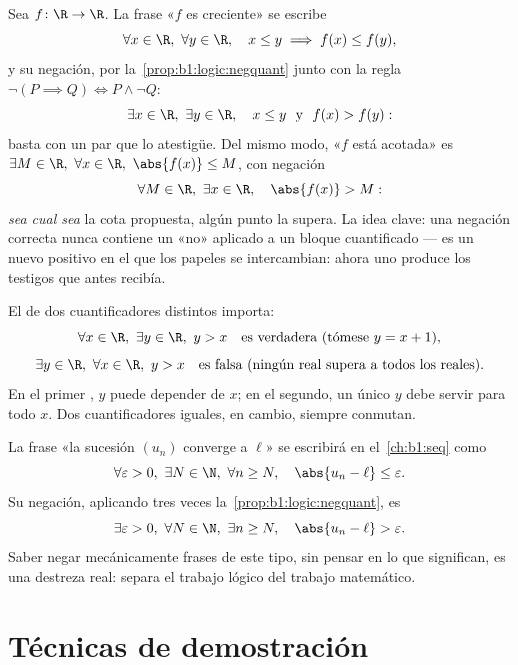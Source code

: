 \begin{example}\label{ex:b1:logic:negpractice}
Sea $f \colon \R \to \R$. La frase «$f$ es creciente» se escribe
\[
\forall x \in \R,\ \forall y \in \R,\quad
x \leq y \implies f(x) \leq f(y) ,
\]
y su negación, por la~\cref{prop:b1:logic:negquant} junto con la regla
$\lnot(P \implies Q) \iff P \land \lnot Q$:
\[
\exists x \in \R,\ \exists y \in \R,\quad
x \leq y \ \text{ y }\ f(x) > f(y) :
\]
basta con un par que lo atestigüe. Del mismo modo, «$f$ está acotada»
es $\exists M \in \R,\ \forall x \in \R,\ \abs{f(x)} \leq M$, con
negación
\[
\forall M \in \R,\ \exists x \in \R,\quad \abs{f(x)} > M :
\]
\emph{sea cual sea} la cota propuesta, algún punto la supera. La idea
clave: una negación correcta nunca contiene un «no» aplicado a un bloque
cuantificado --- es un nuevo  positivo en el que los papeles se
intercambian: ahora uno produce los testigos que antes recibía.
\end{example}

\begin{example}\label{ex:b1:logic:order}
El  de dos cuantificadores distintos importa:
\[
\forall x \in \R,\ \exists y \in \R,\ y > x
\quad\text{es verdadera (tómese } y = x+1\text{),}
\]
\[
\exists y \in \R,\ \forall x \in \R,\ y > x
\quad\text{es falsa (ningún real supera a todos los reales).}
\]
En el primer , $y$ puede depender de $x$; en el segundo, un
único $y$ debe servir para todo $x$. Dos cuantificadores iguales, en
cambio, siempre conmutan.
\end{example}

\begin{example}\label{ex:b1:logic:limit}
La frase «la sucesión $(u_n)$ converge a $\ell$» se escribirá en
el~\cref{ch:b1:seq} como
\[
\forall \varepsilon > 0,\ \exists N \in \N,\ \forall n \geq N,\quad
\abs{u_n - \ell} \leq \varepsilon .
\]
Su negación, aplicando tres veces la~\cref{prop:b1:logic:negquant}, es
\[
\exists \varepsilon > 0,\ \forall N \in \N,\ \exists n \geq N,\quad
\abs{u_n - \ell} > \varepsilon .
\]
Saber negar mecánicamente frases de este tipo, sin pensar en lo que
significan, es una destreza real: separa el trabajo lógico del trabajo
matemático.
\end{example}

\section{Técnicas de demostración}

